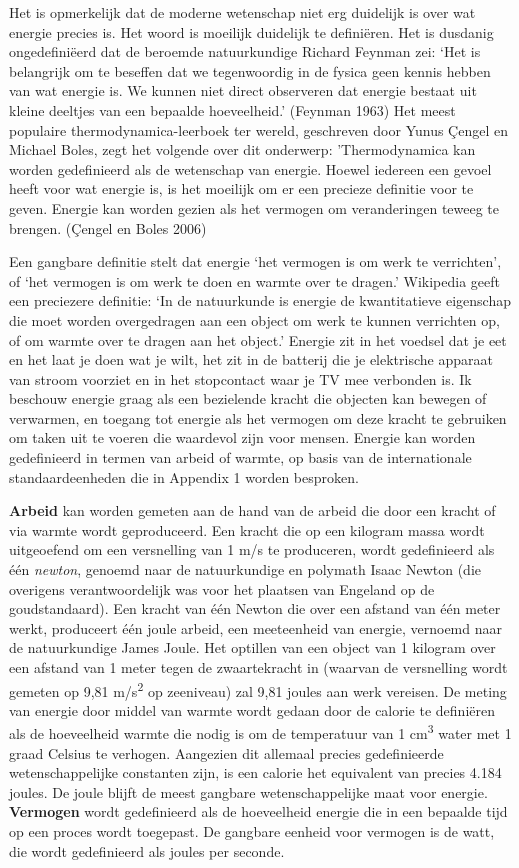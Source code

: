 \documentclass[
  a5paper,
  smalldemyvopaper,11pt,twoside,onecolumn,openright,extrafontsizes,
hidelinks]{memoir}
\begin{document}
Het is opmerkelijk dat de moderne wetenschap niet erg duidelijk is over
wat energie precies is. Het woord is moeilijk duidelijk te definiëren.
Het is dusdanig ongedefiniëerd dat de beroemde natuurkundige Richard
Feynman zei: `Het is belangrijk om te beseffen dat we tegenwoordig in de
fysica geen kennis hebben van wat energie is. We kunnen niet direct
observeren dat energie bestaat uit kleine deeltjes van een bepaalde
hoeveelheid.' (Feynman 1963) Het meest populaire thermodynamica-leerboek
ter wereld, geschreven door Yunus Çengel en Michael Boles, zegt het
volgende over dit onderwerp: 'Thermodynamica kan worden gedefinieerd als
de wetenschap van energie. Hoewel iedereen een gevoel heeft voor wat
energie is, is het moeilijk om er een precieze definitie voor te geven.
Energie kan worden gezien als het vermogen om veranderingen teweeg te
brengen. (Çengel en Boles 2006)

Een gangbare definitie stelt dat energie `het vermogen is om werk te
verrichten', of `het vermogen is om werk te doen en warmte over te
dragen.' Wikipedia geeft een preciezere definitie: `In de natuurkunde is
energie de kwantitatieve eigenschap die moet worden overgedragen aan een
object om werk te kunnen verrichten op, of om warmte over te dragen aan
het object.' Energie zit in het voedsel dat je eet en het laat je doen
wat je wilt, het zit in de batterij die je elektrische apparaat van
stroom voorziet en in het stopcontact waar je TV mee verbonden is. Ik
beschouw energie graag als een bezielende kracht die objecten kan
bewegen of verwarmen, en toegang tot energie als het vermogen om deze
kracht te gebruiken om taken uit te voeren die waardevol zijn voor
mensen. Energie kan worden gedefinieerd in termen van arbeid of warmte,
op basis van de internationale standaardeenheden die in Appendix 1
worden besproken.

\textbf{Arbeid} kan worden gemeten aan de hand van de arbeid die door
een kracht of via warmte wordt geproduceerd. Een kracht die op een
kilogram massa wordt uitgeoefend om een versnelling van 1 m/s te
produceren, wordt gedefinieerd als één \emph{newton}, genoemd naar de
natuurkundige en polymath Isaac Newton (die overigens verantwoordelijk
was voor het plaatsen van Engeland op de goudstandaard). Een kracht van
één Newton die over een afstand van één meter werkt, produceert één
joule arbeid, een meeteenheid van energie, vernoemd naar de
natuurkundige James Joule. Het optillen van een object van 1 kilogram
over een afstand van 1 meter tegen de zwaartekracht in (waarvan de
versnelling wordt gemeten op 9,81 m/s\textsuperscript{2} op zeeniveau)
zal 9,81 joules aan werk vereisen. De meting van energie door middel van
warmte wordt gedaan door de calorie te definiëren als de hoeveelheid
warmte die nodig is om de temperatuur van 1 cm\textsuperscript{3} water
met 1 graad Celsius te verhogen. Aangezien dit allemaal precies
gedefinieerde wetenschappelijke constanten zijn, is een calorie het
equivalent van precies 4.184 joules. De joule blijft de meest gangbare
wetenschappelijke maat voor energie. \textbf{Vermogen} wordt
gedefinieerd als de hoeveelheid energie die in een bepaalde tijd op een
proces wordt toegepast. De gangbare eenheid voor vermogen is de watt,
die wordt gedefinieerd als joules per seconde.
\end{document}
